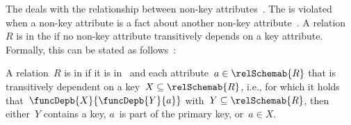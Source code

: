 %
\label{sec:normalForm:3}%
%
The  deals with the relationship between non-key attributes~\cite{C1971FNOTDBRM,C1971NDBSABT,K1983ASGTFNFIRDT,D2003AITDS,EN2015FODS}.
The  is violated when a non-key attribute is a fact about another non-key attribute~\cite{K1983ASGTFNFIRDT}.
A relation~$R$ is in the  if no non-key attribute transitively depends on a key attribute.
Formally, this can be stated as follows~\cite{SS2005EIDDDFDB:SDWSD2}:%
%
\begin{definition}%
\label{def:3nf}%
A relation~$R$ is in  if it is in~ and each attribute~$a\in\relSchemab{R}$ that is transitively dependent on a key~$X\subseteq\relSchemab{R}$, i.e., for which it holds that~$\funcDepb{X}{\funcDepb{Y}{a}}$ with~$Y\subseteq\relSchemab{R}$, then either~$Y$ contains a key, $a$~is part of the primary key, or~$a\in X$.%
\end{definition}%
%
%
%
\endhsection%
%
